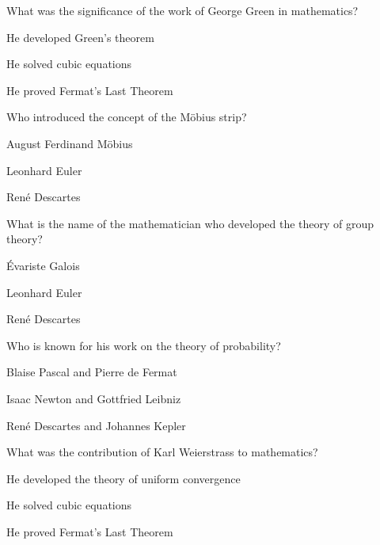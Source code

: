 \begin{enhancedmcq}{What was the significance of the work of George Green in mathematics?}
\item He developed Green's theorem
\item He solved cubic equations
\item He proved Fermat's Last Theorem

\end{enhancedmcq}
\begin{enhancedmcq}{Who introduced the concept of the Möbius strip?}
\item August Ferdinand Möbius
\item Leonhard Euler
\item René Descartes

\end{enhancedmcq}
\begin{enhancedmcq}{What is the name of the mathematician who developed the theory of group theory?}
\item Évariste Galois
\item Leonhard Euler
\item René Descartes

\end{enhancedmcq}
\begin{enhancedmcq}{Who is known for his work on the theory of probability?}
\item Blaise Pascal and Pierre de Fermat
\item Isaac Newton and Gottfried Leibniz
\item René Descartes and Johannes Kepler

\end{enhancedmcq}
\begin{enhancedmcq}{What was the contribution of Karl Weierstrass to mathematics?}
\item He developed the theory of uniform convergence
\item He solved cubic equations
\item He proved Fermat's Last Theorem
\end{enhancedmcq}